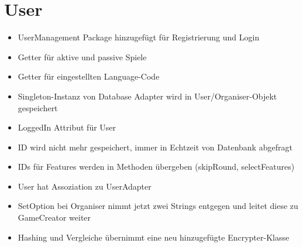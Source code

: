 \documentclass[a4paper]{scrreprt}
\begin{document}
\section{User}
\begin{itemize}
    \item UserManagement Package hinzugefügt für Registrierung und Login
    \item Getter für aktive und passive Spiele
    \item Getter für eingestellten Language-Code
    \item Singleton-Instanz von Database Adapter wird in User/Organiser-Objekt gespeichert
    \item LoggedIn Attribut für User
    \item ID wird nicht mehr gespeichert, immer in Echtzeit von Datenbank abgefragt
    \item IDs für Features werden in Methoden übergeben (skipRound, selectFeatures)
    \item User hat Assoziation zu UserAdapter
    \item SetOption bei Organiser nimmt jetzt zwei Strings entgegen und leitet diese zu GameCreator weiter
    \item Hashing und Vergleiche übernimmt eine neu hinzugefügte Encrypter-Klasse
\end{itemize}
\end{document}
